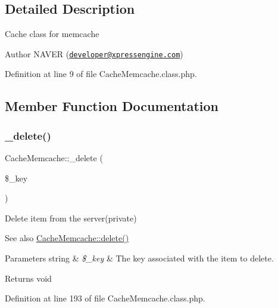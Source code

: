 \subsection{Detailed Description}
Cache class for memcache

\begin{DoxyAuthor}{Author}
N\+A\+V\+ER (\href{mailto:developer@xpressengine.com}{\tt developer@xpressengine.\+com}) 
\end{DoxyAuthor}


Definition at line 9 of file Cache\+Memcache.\+class.\+php.



\subsection{Member Function Documentation}
\hypertarget{classCacheMemcache_a8ac0c5d0703aaeaabec2c478984d43fa}{}\label{classCacheMemcache_a8ac0c5d0703aaeaabec2c478984d43fa} 
\subsubsection{\texorpdfstring{\+\_\+delete()}{\_delete()}}
{\footnotesize\ttfamily Cache\+Memcache\+::\+\_\+delete (\begin{DoxyParamCaption}\item[{}]{\$\+\_\+key }\end{DoxyParamCaption})}

Delete item from the server(private)

\begin{DoxySeeAlso}{See also}
\hyperlink{classCacheMemcache_aca057fd092e1a938410a20e16d2d2d7f}{Cache\+Memcache\+::delete()} 
\end{DoxySeeAlso}

\begin{DoxyParams}[1]{Parameters}
string & {\em \$\+\_\+key} & The key associated with the item to delete. \\
\hline
\end{DoxyParams}
\begin{DoxyReturn}{Returns}
void 
\end{DoxyReturn}


Definition at line 193 of file Cache\+Memcache.\+class.\+php.

\hypertarget{classCacheMemcache_ac4810e2e11716523e49df5a14b2fc215}{}\label{classCacheMemcache_ac4810e2e11716523e49df5a14b2fc215} 
